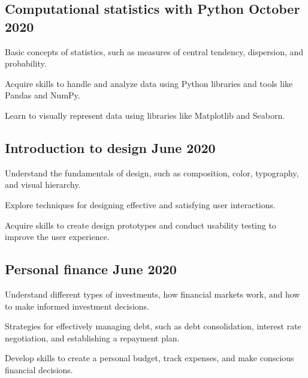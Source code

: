 \subsection{Computational statistics with Python \hfill October 2020}
\begin{zitemize}
\item Basic concepts of statistics, such as measures of central tendency, dispersion, and probability.
\item Acquire skills to handle and analyze data using Python libraries and tools like Pandas and NumPy.
\item Learn to visually represent data using libraries like Matplotlib and Seaborn.
\end{zitemize}

\subsection{Introduction to design \hfill June 2020}
\begin{zitemize}
\item Understand the fundamentals of design, such as composition, color, typography, and visual hierarchy.
\item Explore techniques for designing effective and satisfying user interactions.
\item Acquire skills to create design prototypes and conduct usability testing to improve the user experience.
\end{zitemize}

\subsection{Personal finance \hfill June 2020}
\begin{zitemize}
\item Understand different types of investments, how financial markets work, and how to make informed investment decisions.
\item Strategies for effectively managing debt, such as debt consolidation, interest rate negotiation, and establishing a repayment plan.
\item Develop skills to create a personal budget, track expenses, and make conscious financial decisions.
\end{zitemize}


